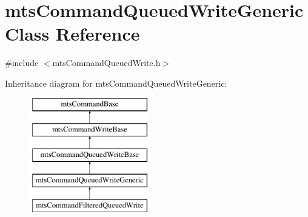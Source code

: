 \hypertarget{classmts_command_queued_write_generic}{}\section{mts\+Command\+Queued\+Write\+Generic Class Reference}
\label{classmts_command_queued_write_generic}


{\ttfamily \#include $<$mts\+Command\+Queued\+Write.\+h$>$}

Inheritance diagram for mts\+Command\+Queued\+Write\+Generic\+:\begin{figure}[H]
\begin{center}
\leavevmode
\includegraphics[height=5.000000cm]{d1/dd1/classmts_command_queued_write_generic}
\end{center}
\end{figure}
